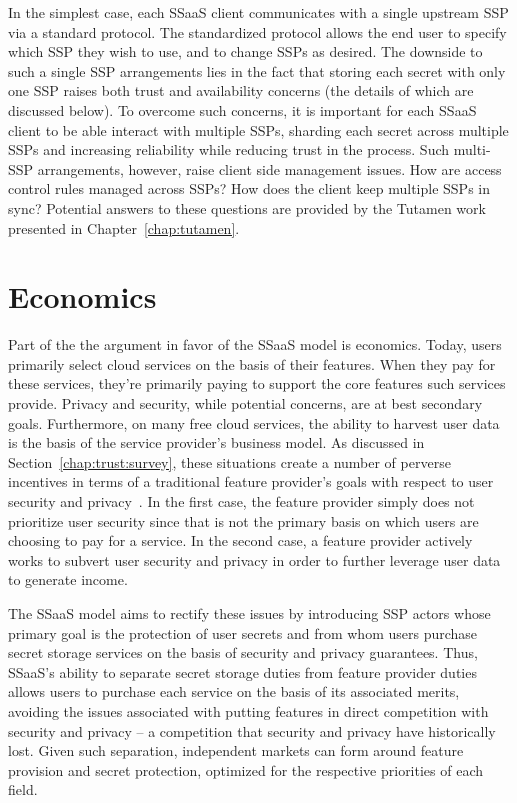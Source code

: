 In the simplest case, each SSaaS client communicates with a single
upstream SSP via a standard protocol. The standardized protocol allows
the end user to specify which SSP they wish to use, and to change SSPs
as desired. The downside to such a single SSP arrangements lies in the
fact that storing each secret with only one SSP raises both trust and
availability concerns (the details of which are discussed below). To
overcome such concerns, it is important for each SSaaS client to be
able interact with multiple SSPs, sharding each secret across multiple
SSPs and increasing reliability while reducing trust in the
process. Such multi-SSP arrangements, however, raise client side
management issues. How are access control rules managed across SSPs?
How does the client keep multiple SSPs in sync? Potential answers to
these questions are provided by the Tutamen work presented in
Chapter~\ref{chap:tutamen}.

\section{Economics}
\label{chap:ssaas:economics}

Part of the the argument in favor of the SSaaS model is
economics. Today, users primarily select cloud services on the basis
of their features. When they pay for these services, they're primarily
paying to support the core features such services provide. Privacy and
security, while potential concerns, are at best secondary
goals. Furthermore, on many free cloud services, the ability to
harvest user data is the basis of the service provider's business
model. As discussed in Section~\ref{chap:trust:survey}, these
situations create a number of perverse incentives in terms of a
traditional feature provider's goals with respect to user security and
privacy~\cite{anderson2001}. In the first case, the feature provider
simply does not prioritize user security since that is not the primary
basis on which users are choosing to pay for a service. In the second
case, a feature provider actively works to subvert user security and
privacy in order to further leverage user data to generate income.

The SSaaS model aims to rectify these issues by introducing SSP actors
whose primary goal is the protection of user secrets and from whom
users purchase secret storage services on the basis of security and
privacy guarantees. Thus, SSaaS's ability to separate secret storage
duties from feature provider duties allows users to purchase each
service on the basis of its associated merits, avoiding the issues
associated with putting features in direct competition with security
and privacy -- a competition that security and privacy have
historically lost. Given such separation, independent markets can form
around feature provision and secret protection, optimized for the
respective priorities of each field.

